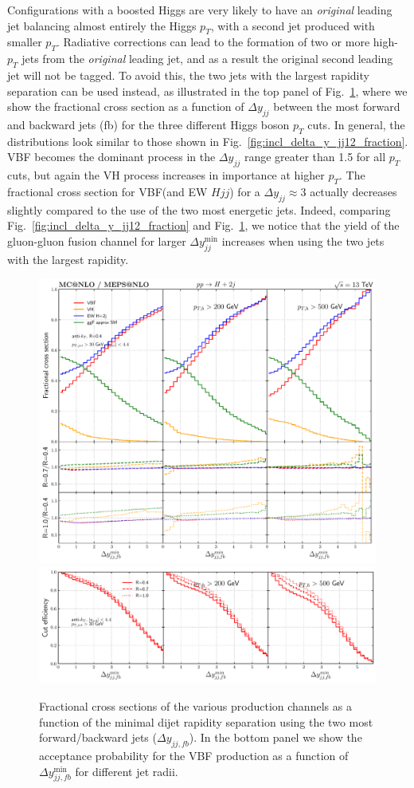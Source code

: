 \documentclass[10pt,prd,fleqn,superscriptaddress,notitlepage,nofootinbib,preprintnumbers,nobalancelastpage]{revtex4-1}
\newcommand{\VBF}{VBF\xspace}
\newcommand{\VH}{VH\xspace}
\begin{document}
Configurations with a boosted Higgs are very likely to have an {\it original} leading jet balancing almost entirely the Higgs $p_T$, with a second jet produced with smaller $p_T$. Radiative corrections can lead to the formation of two or more high-$p_T$ jets from the {\it original} leading jet, and as a result the {\it} original second leading jet will not be tagged. To avoid this,  the two jets with the largest rapidity separation can be used instead, as illustrated in the top panel of Fig.~\ref{fig:incl_delta_y_jj12_fraction_fb}, where we show the fractional cross section  as a function of $\Delta y_{jj}$ between the most forward and backward jets (fb)  for the three different Higgs boson $p_T$ cuts. In general, the distributions look  similar to those shown in Fig.~\ref{fig:incl_delta_y_jj12_fraction}. \VBF becomes the dominant process in the $\Delta y_{jj}$ range greater than 1.5 for all $p_T$ cuts, but again  the \VH process increases in importance at higher $p_T$. The fractional cross section for \VBF (and EW $Hjj$) for a $\Delta y_{jj} \approx 3$ actually decreases slightly compared to the use of the two most energetic jets.
Indeed, comparing Fig.~\ref{fig:incl_delta_y_jj12_fraction} and Fig.~\ref{fig:incl_delta_y_jj12_fraction_fb}, we notice that the yield of the gluon-gluon fusion channel for larger $\Delta y_{jj}^{\min}$ increases when using the two jets with the largest rapidity.


\begin{figure}[t]
  \centering
  \includegraphics[width=.65\textwidth]{figures/vbf/delta_y_jjfb.pdf}
  \includegraphics[width=.65\textwidth]{figures/vbf/delta_y_jjfb_frac.pdf}
\caption{Fractional cross sections of the various production channels as a function of the minimal dijet rapidity separation using the two most forward/backward jets ($\Delta y_{jj,fb}$).
In the bottom panel we show the acceptance probability for the \VBF{} production as a function of $\Delta y_{jj,fb}^{\min}$ for different jet radii.
}
\label{fig:incl_delta_y_jj12_fraction_fb}
\end{figure}
\end{document}
